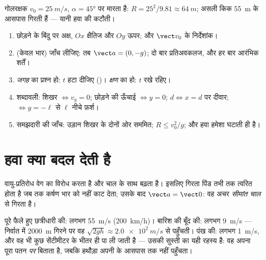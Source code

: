 \begin{example}[गोल-किक]\label{ex:g12:projectile-motion:kick}
गोलरक्षक $v_0 = \qty{25}{m/s}$, $\alpha = \ang{45}$ पर मारता है: $R = 25^2/9.81 \approx \qty{64}{m}$; असली किक \qty{55}{m} के आसपास
गिरती हैं --- यानी हवा की कटौती।
\end{example}

\begin{method}[प्रक्षेप्य का बहीखाता]\label{met:g12:projectile-motion:method}
\begin{enumerate}
  \item छोड़ने के बिंदु पर अक्ष, $Ox$ क्षैतिज और $Oy$ ऊपर; और $\vect v_0$
        के निर्देशांक।
  \item {} (केवल भार) जाँच लीजिए: तब $\vect a = (0,-g)$;
        दो बार प्रतिअवकलज, और हर बार आरंभिक शर्तें।
  \item \emph{जगह} का प्रश्न हो: $t$ हटा दीजिए ()।
        \emph{क्षण} का हो: $t$ रखे रहिए।
  \item शब्दावली: शिखर $\Leftrightarrow v_y = 0$; छोड़ने की ऊँचाई $\Leftrightarrow y = 0$; $d \Leftrightarrow x = d$ पर दीवार;
        $\Leftrightarrow y = -\ell$ से $\ell$ नीचे फ़र्श।
  \item समझदारी की जाँच: उड़ान शिखर के दोनों ओर सममित; $R \leq v_0^2/g$; और हवा हमेशा
        घटाती ही है।
\end{enumerate}
\end{method}

\section{हवा क्या बदल देती है}

\begin{definition}[सीमांत चाल]\label{def:g12:projectile-motion:terminal}
वायु-प्रतिरोध वेग का विरोध करता है और चाल के साथ बढ़ता है। इसलिए गिरता
पिंड तभी तक त्वरित होता है जब तक कर्षण भार को नहीं काट देता; उसके बाद
$\vect a = \vect 0$: वह अचर \emph{सीमांत चाल} से गिरता है।
\end{definition}

\begin{example}[सीमांत चाल की कोटियाँ]\label{ex:g12:projectile-motion:airorders}
पूरे फैले हुए छत्रीधारी की: लगभग \qty{55}{m/s} (\qty{200}{km/h})। बारिश की बूँद की: लगभग
\qty{9}{m/s} --- निर्वात में \qty{2000}{m} गिरने पर वह $\sqrt{2gh} \approx \qty{2.0e2}{m/s}$ से पहुँचती। पंख की: लगभग
\qty{1}{m/s}, और वह भी कुछ सेंटीमीटर के भीतर ही पा ली जाती है --- उसकी सुस्ती का
यही रहस्य है: वह अपना पूरा पतन  \emph{पर} बिताता है, जबकि
हथौड़ा अपनी  के आसपास तक नहीं पहुँचता।
\end{example}

